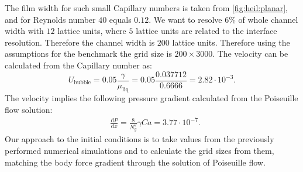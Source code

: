 \documentclass{article}
\begin{document}
\begin{description}
  The film width for such small Capillary numbers is taken from
  \ref{fig:heil:planar}, and for Reynolds number $40$ equals $0.12$. We want to
  resolve $6\%$ of whole channel width with $12$ lattice units, where $5$
lattice units are related to the interface resolution.  Therefore the channel
  width is $200$ lattice units. Therefore using the assumptions for the benchmark 
the grid size is $200 \times 3000$. The velocity can be
calculated from the Capillary number as:
  \begin{equation}
  U_{\mathrm{bubble}}=0.05 \frac{\gamma}{\mu_{\mathrm{liq}}}=0.05 \frac{0.037712}{0.6666}=2.82\cdot
  10^{-3}.
  \end{equation}
  The velocity implies the following pressure gradient calculated from the
  Poiseuille flow solution:
  \begin{equation}
  \begin{aligned}
  &\frac{\mathrm{d}P}{\mathrm{d}x}=\frac{8}{N_y^2}\gamma Ca=3.77\cdot10^{-7}.
  \end{aligned}
  \end{equation}
  Our approach to the initial conditions is  to take values from the previously performed
numerical simulations and to calculate the grid sizes from them, matching the
body force gradient through the solution of Poiseuille flow.

\end{description}
\end{document}
